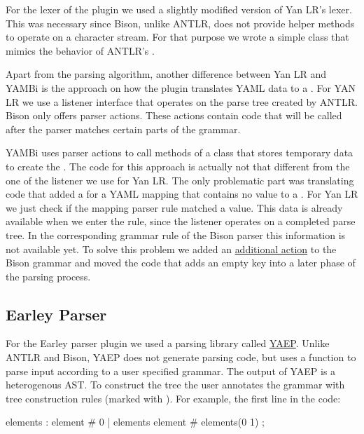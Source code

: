 For the lexer of the plugin we used a slightly modified version of Yan LR’s lexer. This was necessary since Bison, unlike ANTLR, does not provide helper methods to operate on a character stream. For that purpose we wrote a simple class that mimics the behavior of ANTLR’s .

Apart from the parsing algorithm, another difference between Yan LR and YAMBi is the approach on how the plugin translates YAML data to a . For YAN LR we use a listener interface that operates on the parse tree created by ANTLR. Bison only offers parser actions. These actions contain code that will be called after the parser matches certain parts of the grammar.

YAMBi uses parser actions to call methods of a class that stores temporary data to create the . The code for this approach is actually not that different from the one of the listener we use for Yan LR. The only problematic part was translating code that added a  for a YAML mapping that contains no value to a . For Yan LR we just check if the mapping parser rule matched a value. This data is already available when we enter the rule, since the listener operates on a completed parse tree. In the corresponding grammar rule of the Bison parser this information is not available yet. To solve this problem we added an \href{https://master.libelektra.org/src/plugins/yambi/parser.ypp#L64-L67}{additional action} to the Bison grammar and moved the code that adds an empty key into a later phase of the parsing process.

\subsection{Earley Parser}
\label{sec:earley_parser}

For the Earley parser plugin we used a parsing library called \href{https://github.com/vnmakarov/yaep}{\gls{YAEP}}. Unlike ANTLR and Bison, \gls{YAEP} does not generate parsing code, but uses a function to parse input according to a user specified grammar. The output of YAEP is a heterogenous \gls{AST}. To construct the tree the user annotates the grammar with tree construction rules (marked with \code{\#}). For example, the first line in the code:

\begin{shellcode}
elements : element          # 0
         | elements element # elements(0 1)
         ;
\end{shellcode}

